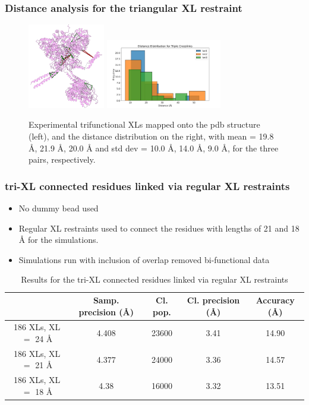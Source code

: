 \documentclass[a4paper,8pt]{beamer}
\begin{document}
%
\begin{frame}
  \frametitle{Distance analysis for the triangular XL restraint}
  \begin{figure}
    \centering
    \includegraphics[width=0.3\textwidth]{test-figures/exp-triples.png}
    \includegraphics[width=0.45\textwidth]{test-figures/tri-distribution.png}
    \caption{Experimental trifunctional XLs mapped onto the pdb structure (left), and the distance distribution on the right, with
    mean = 19.8 {\AA}, 21.9 {\AA}, 20.0 {\AA} and std dev = 10.0 {\AA}, 14.0 {\AA}, 9.0 {\AA}, for the three pairs, respectively.}
    \end{figure}
\end{frame}
%
\begin{frame}
\frametitle{tri-XL connected residues linked via regular XL restraints}
\begin{itemize}
  \item No dummy bead used
  \item Regular XL restraints used to connect the residues with lengths of 21 and 18 {\AA} for the simulations.
  \item Simulations run with inclusion of overlap removed bi-functional data
\end{itemize}
\begin{table}
  \centering
  \caption{Results for the tri-XL connected residues linked via regular XL restraints}
  \begin{tabular}{|c|c|c|c|c|}
      \hline
                                   & Samp. precision ({\AA}) & Cl. pop. & Cl. precision ({\AA}) & Accuracy ({\AA})\\ \hline
      186 XLs, XL $=$ 24 {\AA} & 4.408  & 23600 & 3.41 & 14.90\\ \hline
      186 XLs, XL $=$ 21 {\AA} & 4.377  & 24000 & 3.36 & 14.57\\ \hline
      186 XLs, XL $=$ 18 {\AA} & 4.38   & 16000 & 3.32 & 13.51\\ \hline
  \end{tabular}
\end{table}
\end{frame}
\end{document}
